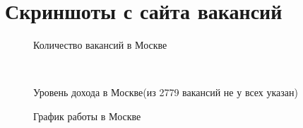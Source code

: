 \documentclass[referat]{SCWorks}
\begin{document}
 \nocite{*}




\appendix
\section{Скриншоты с сайта вакансий}

\begin{figure}[H]
	\caption{Количество вакансий в Москве}
	\label{fin2}
\end{figure}
\begin{figure}[H]
	\
	\caption{Уровень дохода в Москве(из 2779 вакансий не у всех указан)}
	\label{fin1}
\end{figure}

\begin{figure}[H]
	\caption{График работы в Москве}
	\label{fin3}
\end{figure}




\end{document}
